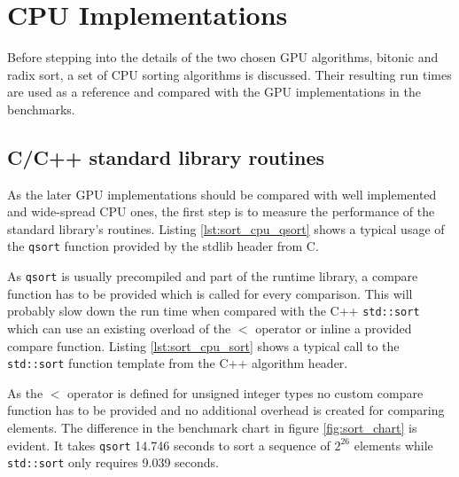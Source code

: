 \section{CPU Implementations}

Before stepping into the details of the two chosen GPU algorithms, bitonic and radix sort, a set of CPU sorting algorithms is discussed. Their resulting run times are used as a reference and compared with the GPU implementations in the benchmarks.

\subsection{C/C++ standard library routines}

As the later GPU implementations should be compared with well implemented and wide-spread CPU ones, the first step is to measure the performance of the standard library's routines.
Listing \ref{lst:sort_cpu_qsort} shows a typical usage of the \lstinline!qsort! function provided by the stdlib header from C.



As \lstinline|qsort| is usually precompiled and part of the runtime library, a compare function has to be provided which is called for every comparison. This will probably slow down the run time when compared with the C++ \lstinline!std::sort! which can use an existing overload of the $<$ operator or inline a provided compare function.
Listing \ref{lst:sort_cpu_sort} shows a typical call to the \lstinline!std::sort! function template from the C++ algorithm header.



As the $<$ operator is defined for unsigned integer types no custom compare function has to be provided and no additional overhead is created for comparing elements.
The difference in the benchmark chart in figure \ref{fig:sort_chart} is evident. It takes \lstinline!qsort! 14.746 seconds to sort a sequence of $2^{26}$ elements while \lstinline!std::sort! only requires 9.039 seconds.

